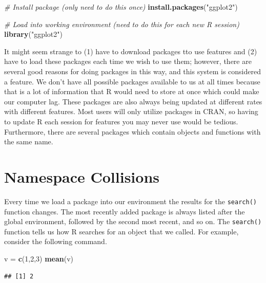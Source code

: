 \documentclass[
]{book}
\newenvironment{Shaded}{\begin{snugshade}}{\end{snugshade}}
\newcommand{\CommentTok}[1]{\textcolor[rgb]{0.56,0.35,0.01}{\textit{#1}}}
\newcommand{\DecValTok}[1]{\textcolor[rgb]{0.00,0.00,0.81}{#1}}
\newcommand{\KeywordTok}[1]{\textcolor[rgb]{0.13,0.29,0.53}{\textbf{#1}}}
\newcommand{\NormalTok}[1]{#1}
\newcommand{\StringTok}[1]{\textcolor[rgb]{0.31,0.60,0.02}{#1}}
\begin{document}
\begin{Shaded}
\begin{Highlighting}[]
\CommentTok{# Install package (only need to do this once)}
\KeywordTok{install.packages}\NormalTok{(}\StringTok{"ggplot2"}\NormalTok{)}

\CommentTok{# Load into working environment (need to do this for each new R session)}
\KeywordTok{library}\NormalTok{(}\StringTok{"ggplot2"}\NormalTok{)}
\end{Highlighting}
\end{Shaded}

It might seem strange to (1) have to download packages tto use features and (2) have to load these packages each time we wish to use them; however, there are several good reasons for doing packages in this way, and this system is considered a feature. We don't have all possible packages available to us at all times because that is a lot of information that R would need to store at once which could make our computer lag. These packages are also always being updated at different rates with different features. Most users will only utilize packages in CRAN, so having to update R each session for features you may never use would be tedious. Furthermore, there are several packages which contain objects and functions with the same name.

\hypertarget{namespace-collisions}{%
\section{Namespace Collisions}\label{namespace-collisions}}

Every time we load a package into our environment the results for the \texttt{search()} function changes. The most recently added package is always listed after the global environment, followed by the second most recent, and so on.
The \texttt{search()} function tells us how R searches for an object that we called. For example, consider the following command.

\begin{Shaded}
\begin{Highlighting}[]
\NormalTok{v =}\StringTok{ }\KeywordTok{c}\NormalTok{(}\DecValTok{1}\NormalTok{,}\DecValTok{2}\NormalTok{,}\DecValTok{3}\NormalTok{)}
\KeywordTok{mean}\NormalTok{(v)}
\end{Highlighting}
\end{Shaded}

\begin{verbatim}
## [1] 2
\end{verbatim}
\end{document}
